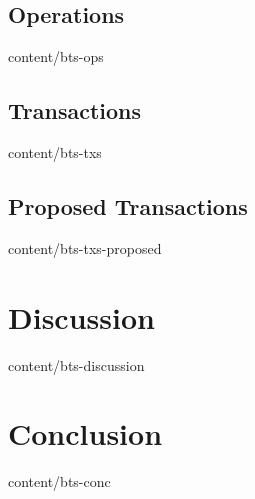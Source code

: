 \documentclass{btswhitepaper}
\begin{document}
\subsection    { Operations                        }  { content/bts-ops             } 
\subsection    { Transactions                      }  { content/bts-txs             } 
\subsection    { Proposed Transactions             }  { content/bts-txs-proposed    }

\section       { Discussion                        }  { content/bts-discussion      } 

\section       { Conclusion                        }  { content/bts-conc            } 




\end{document}
